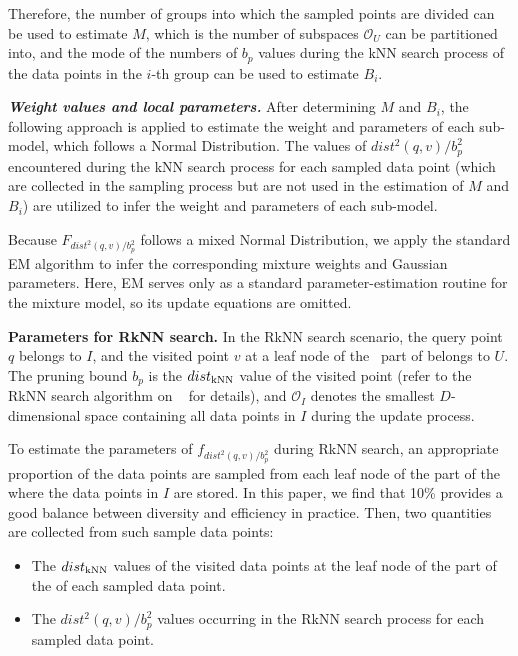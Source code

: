 Therefore, the number of groups into which the sampled points are divided can be used to estimate $M$, which is the number of subspaces $\mathcal{O}_U$ can be partitioned into, and the mode of the numbers of $b_p$ values during the kNN search process of the data points in the $i$-th group can be used to estimate $B_i$.


\noindent\textbf{\textit{Weight values and local parameters.}}
After determining $M$ and $B_i$, the following approach is applied to estimate the weight and parameters of each sub-model, which follows a Normal Distribution. The values of $dist^2(q, v)/b_{p}^2$ encountered during the kNN search process for each sampled data point (which are collected in the sampling process but are not used in the estimation of $M$ and $B_i$) are utilized to infer the weight and parameters of each sub-model.

Because $F_{dist^2(q,v)/b_{p}^2}$ follows a mixed Normal Distribution, we apply the standard EM algorithm \cite{ng2012algorithm} to infer the corresponding mixture weights and Gaussian parameters. Here, EM serves only as a standard parameter-estimation routine for the mixture model, so its update equations are omitted.

\noindent\textbf{Parameters for RkNN search.}
In the RkNN search scenario, the query point $q$ belongs to $I$, and the visited point $v$ at a leaf node of the \hdrtree\ part of \dualtree belongs to $U$. The pruning bound $b_p$ is the $dist_{\operatorname{kNN}}$ value of the visited point (refer to the RkNN search algorithm on \hdrtree~\cite{yang2014continuous} for details), and $\mathcal{O}_I$ denotes the smallest $D$-dimensional space containing all data points in $I$ during the update process. 

To estimate the parameters of $f_{dist^2(q,v)/b^2_p}$ during RkNN search, an appropriate proportion of the data points are sampled from each leaf node of the \deltatree part of the \dualtree where the data points in $I$ are stored. In this paper, we find that 10\% provides a good balance between diversity and efficiency in practice. Then, two quantities are collected from such sample data points:
\begin{itemize}
    \item The $dist_{\operatorname{kNN}}$ values of the visited data points at the leaf node of the \hdrtree part of the \dualtree of each sampled data point.
    \item The $dist^2(q,v)/b_{p}^2$ values occurring in the RkNN search process for each sampled data point.  
\end{itemize}


